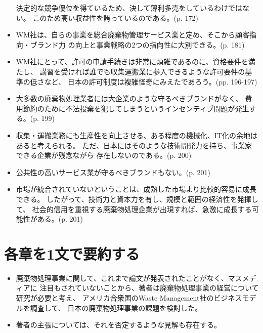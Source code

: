 \documentclass[a4j]{jsarticle}
\begin{document}
\begin{itemize}
  決定的な競争優位を得ているため、決して薄利多売をしているわけではない。
  このため高い収益性を誇っているのである。(p. 172)
\item
  WM社は、自らの事業を総合廃棄物管理サービス業と定め、そこから顧客指向・ブランド力
  の向上と事業戦略の2つの指向性に大別できる。(p. 181)
\item
  WM社にとって、許可の申請手続きは非常に煩雑であるのに、資格要件を満たし、
  講習を受ければ誰でも収集運搬業に参入できるような許可要件の基準の低さなど、
  日本の許可制度は複雑怪奇にみえたであろう。(pp. 196-197)
\item
  大多数の廃棄物処理業者には大企業のような守るべきブランドがなく、
  費用節約のために不法投棄を犯してしまうというインセンティブ問題が発生する。(p. 199)
\item
  収集・運搬業務にも生産性を向上させる、ある程度の機械化、IT化の余地はあると考えられる。
  ただ、日本にはそのような技術開発力を持ち、事業家できる企業が残念ながら
  存在しないのである。(p. 200)
\item
  公共性の高いサービス業が守るべきブランドもない。(p. 201)
\item
  市場が統合されていないということは、成熟した市場より比較的容易に成長できる。
  したがって、技術力と資本力を有し、規模と範囲の経済性を発揮して、
  社会的信用を重視する廃棄物処理企業が出現すれば、急激に成長する可能性がある。(p. 201)
\end{itemize}


\section{各章を1文で要約する}
\begin{itemize}
\item
  廃棄物処理事業に関して、これまで論文が発表されたことがなく、マスメディアに
  注目もされていないことから、著者は廃棄物処理事業の経営について研究が必要と考え、
  アメリカ合衆国のWaste Management社のビジネスモデルを調査して、
  日本の廃棄物処理事業の課題を検討した。
\item
  著者の主張については、それを否定するような見解も存在する。~\cite{sangyo-haikibutsu-shorigyo-no-keiei-jitsumu-daiichihoki}
\end{itemize}



\end{document}
